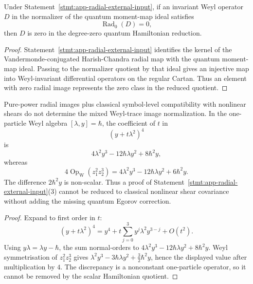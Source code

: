 \begin{lem}
\label{lem:app-radial-map-injectivity}
  Under Statement~\ref{stmt:app-radial-external-input}, if an invariant
  Weyl operator \(D\) in the normalizer of the quantum moment-map ideal
  satisfies
  \[
    \operatorname{Rad}_0(D)=0,
  \]
  then \(D\) is zero in the degree-zero quantum Hamiltonian reduction.
\end{lem}

\begin{proof}
  Statement~\ref{stmt:app-radial-external-input} identifies the kernel
  of the Vandermonde-conjugated Harish-Chandra radial map with the
  quantum moment-map ideal.  Passing to the normalizer quotient by that
  ideal gives an injective map into Weyl-invariant differential
  operators on the regular Cartan.  Thus an element with zero radial
  image represents the zero class in the reduced quotient.
\end{proof}

\begin{lem}
\label{lem:app-radial-nonlinear-shear-obstruction}
  Pure-power radial images plus classical symbol-level compatibility
  with nonlinear shears do not determine the mixed Weyl-trace image
  normalization.  In the one-particle Weyl algebra
  \([\lambda,y]=\hbar\), the coefficient of \(t\) in
  \[
    (y+t\lambda^2)^4
  \]
  is
  \[
    4\lambda^2y^3-12\hbar\lambda y^2+8\hbar^2 y,
  \]
  whereas
  \[
    4\operatorname{Op}_{\mathrm W}(z_1^2z_2^3)
    =
    4\lambda^2y^3-12\hbar\lambda y^2+6\hbar^2 y.
  \]
  The difference \(2\hbar^2y\) is non-scalar.  Thus a proof of
  Statement~\ref{stmt:app-radial-external-input}(3) cannot be reduced to
  classical nonlinear shear covariance without adding the missing
  quantum Egorov correction.
\end{lem}

\begin{proof}
  Expand to first order in \(t\):
  \[
    (y+t\lambda^2)^4
    =
    y^4+t\sum_{j=0}^3 y^j\lambda^2y^{3-j}+O(t^2).
  \]
  Using \(y\lambda=\lambda y-\hbar\), the sum normal-orders to
  \(4\lambda^2y^3-12\hbar\lambda y^2+8\hbar^2y\).
  Weyl symmetrisation of \(z_1^2z_2^3\) gives
  \(\lambda^2y^3-3\hbar\lambda y^2+\frac32\hbar^2y\), hence the
  displayed value after multiplication by \(4\).  The discrepancy is a
  nonconstant one-particle operator, so it cannot be removed by the
  scalar Hamiltonian quotient.
\end{proof}

